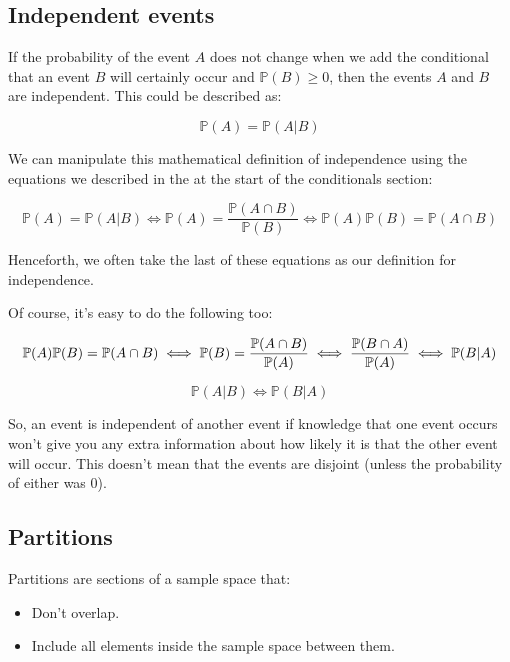 \subsection{Independent events}

If the probability of the event $A$ does not change when we add the conditional
that an event $B$ will certainly occur and $\mathbb{P}(B) \ge 0$, then the
events $A$ and $B$ are independent. This could be described as:

\begin{dmath}
	{\mathbb{P}(A) = \mathbb{P}(A|B)}
\end{dmath}

We can manipulate this mathematical definition of independence using the
equations we described in the at the start of the conditionals section:

\begin{dmath}
	{\mathbb{P}(A) = \mathbb{P}(A|B)} \iff {\mathbb{P}(A) = \frac{\mathbb{P}(A \cap B)}{\mathbb{P}(B)}} \iff {\mathbb{P}(A)\mathbb{P}(B) = \mathbb{P}(A \cap B)}
\end{dmath}

Henceforth, we often take the last of these equations as our definition for
independence.

Of course, it's easy to do the following too:

\begin{dmath}
	{\mathbb{P}(A)\mathbb{P}(B) = \mathbb{P}(A \cap B)} \iff {\mathbb{P}(B) = \frac{\mathbb{P}(A \cap B)}{\mathbb{P}(A)}} \iff {\frac{\mathbb{P}(B \cap A)}{\mathbb{P}(A)}} \iff {\mathbb{P}(B|A)}\\	
\end{dmath}

\begin{dmath}
	{\mathbb{P}(A|B) \iff \mathbb{P}(B|A)}
\end{dmath}

So, an event is independent of another event if knowledge that one event occurs
won't give you any extra information about how likely it is that the other event
will occur. This doesn't mean that the events are disjoint (unless the
probability of either was $0$).

\subsection{Partitions}

Partitions are sections of a sample space that:

\begin{itemize}
	\item Don't overlap.
	\item Include all elements inside the sample space between them.
\end{itemize}

